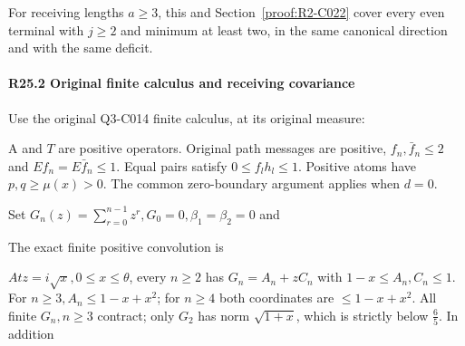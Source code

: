 For receiving lengths \(a\ge3\), this and Section~\ref{proof:R2-C022} cover every even terminal with \(j\ge2\) and minimum at least two, in the same canonical direction and with the same deficit.

\paragraph{R25.2 Original finite calculus and receiving covariance}

Use the original Q3-C014 finite calculus, at its original measure:


A and \(T\) are positive operators. Original path messages are positive, \(f_n,\allowbreak \allowbreak \bar f_n\le 2\) and \(E f_n=E \bar f_n\le 1\). Equal pairs satisfy \(0\le f_l h_l\le 1\). Positive atoms have \(p,\allowbreak \allowbreak q\ge \mu(x)>0\).  The common zero-boundary argument applies when \(d=0\).

Set \(G_n(z)=\sum_{r=0}^{n-1}z^r,\allowbreak \allowbreak  G_{0}=0,\allowbreak \allowbreak  \beta_{1}=\beta_{2}=0\) and


The exact finite positive convolution is


\(At z=i \sqrt{x},\allowbreak \allowbreak  0\le x\le \theta\), every \(n\ge 2\) has \(G_n=A_n+z C_n\) with \(1-x\le A_n,\allowbreak \allowbreak C_n\le 1\). For \(n\ge 3,\allowbreak \allowbreak  A_n\le 1-x+x^2\); for \(n\ge 4\) both coordinates are \(\le 1-x+x^2\). All finite \(G_n,\allowbreak \allowbreak n\ge 3\) contract; only \(G_{2}\) has norm \(\sqrt{1+x}\), which is strictly below \(\frac{6}{5}\). In addition


